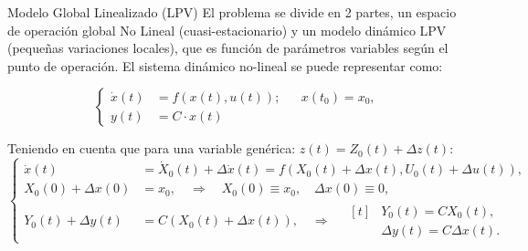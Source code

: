 \documentclass[12pt]{beamer}
\begin{document}
\begin{frame}{Modelo Global Linealizado (LPV)}\footnotesize
El problema se divide en 2 partes, un espacio de operación global No Lineal (cuasi-estacionario) y un modelo dinámico LPV (pequeñas variaciones locales), que es función de parámetros variables según el punto de operación. El sistema dinámico no-lineal se puede representar como:

\begin{equation}
\left\{
\begin{aligned}
    \dot{x}(t) &= f(x(t),u(t)); && x(t_0) = x_0, \\ 
    y(t) &= C \cdot x(t)
\end{aligned}
\right.
\label{eq:linealizacion_sistemas}
\end{equation}

Teniendo en cuenta que para una variable genérica: $z(t) = Z_0(t) + \Delta z(t)$:
\begin{equation}
\left\{
\begin{aligned}
    \dot{x}(t) &= \dot{X}_0(t) + \Delta \dot{x}(t) = f(X_0(t) + \Delta x(t), U_0(t) + \Delta u(t)), \\
    X_0(0) + \Delta x(0) &= x_0, \quad \Longrightarrow \quad X_0(0) \equiv x_0, \quad \Delta x(0) \equiv 0, \\
    Y_0(t) + \Delta y(t) &= C(X_0(t) + \Delta x(t)), \quad \Longrightarrow \quad 
    \begin{aligned}[t]
    &Y_0(t) = C X_0(t), \\
    &\Delta y(t) = C \Delta x(t).
    \end{aligned}
\end{aligned}
\right.
\end{equation}
\end{frame}
\end{document}
